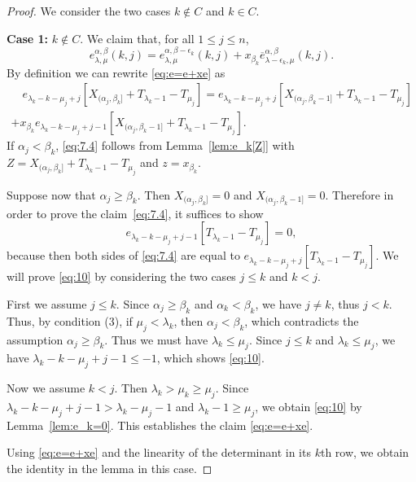 \documentclass[12pt]{amsart}
\numberwithin{equation}{section}
\theoremstyle{definition}
\newcommand\ove{\overline{e}}
\begin{document}
\begin{proof}
We consider the two cases $k\notin C$ and $k\in C$.

\textbf{Case 1:} $k\not\in C$. We claim that, for all $1\le j\le n$,
\begin{equation}\label{eq:e=e+xe}
  e_{\lambda,\mu}^{\alpha,\beta}(k,j)
  =e_{\lambda,\mu}^{\alpha,\beta-\epsilon_k}(k,j)
  +x_{\beta_k} \ove_{\lambda-\epsilon_k,\mu}^{\alpha,\beta}(k,j).
\end{equation}
By definition we can rewrite \eqref{eq:e=e+xe} as 
\begin{multline}\label{eq:7.4}
\quad  e_{\lambda_k-k-\mu_j+j}[X_{(\alpha_j,\beta_k]}+T_{\lambda_k-1}-T_{\mu_j}]
  = e_{\lambda_k-k-\mu_j+j}[X_{(\alpha_j,\beta_k-1]}+T_{\lambda_k-1}-T_{\mu_j}]\\
  + x_{\beta_k}
  e_{\lambda_k-k-\mu_j+j-1}[X_{(\alpha_j,\beta_k-1]}+T_{\lambda_k-1}-T_{\mu_j}].
\end{multline}
If $\alpha_j<\beta_k$, \eqref{eq:7.4} follows from Lemma~\ref{lem:e_k[Z]} with
$Z=X_{(\alpha_j,\beta_k]}+T_{\lambda_k-1}-T_{\mu_j}$ and $z=x_{\beta_k}$.

Suppose now that $\alpha_j\ge \beta_k$. Then $X_{(\alpha_j, \beta_k]} = 0$ and
$X_{(\alpha_j, \beta_k-1]} = 0$. Therefore in order to prove the
claim~\eqref{eq:7.4}, it suffices to show
\begin{equation}
  \label{eq:10}
 e_{\lambda_k-k-\mu_j+j-1}[T_{\lambda_k-1}-T_{\mu_j}] = 0, 
\end{equation}
because then both sides of \eqref{eq:7.4} are equal to
$e_{\lambda_k-k-\mu_j+j}[T_{\lambda_k-1}-T_{\mu_j}]$. We will prove
\eqref{eq:10} by considering the two cases $j\le k$ and $k<j$.

First we assume $j\le k$. Since $\alpha_j\ge \beta_k$ and $\alpha_k<\beta_k$, we
have $j\ne k$, thus $j<k$. Thus, by condition (3), if $\mu_j<\lambda_k$, then
$\alpha_j<\beta_k$, which contradicts the assumption $\alpha_j\ge \beta_k$. Thus
we must have $\lambda_k\le \mu_j$. Since $j\le k$ and $\lambda_k\le \mu_j$, we
have $\lambda_k-k-\mu_j+j-1 \le -1$, which shows \eqref{eq:10}.

Now we assume $k<j$. Then $\lambda_k>\mu_k\ge\mu_j$. Since
$\lambda_k-k-\mu_j+j-1>\lambda_k-\mu_j-1$ and $\lambda_{k}-1\ge \mu_j$, we
obtain \eqref{eq:10} by Lemma~\ref{lem:e_k=0}. This establishes the claim
\eqref{eq:e=e+xe}.

Using \eqref{eq:e=e+xe} and the linearity of the determinant in its $k$th row,
we obtain the identity in the lemma in this case.


\end{proof}
\end{document}
